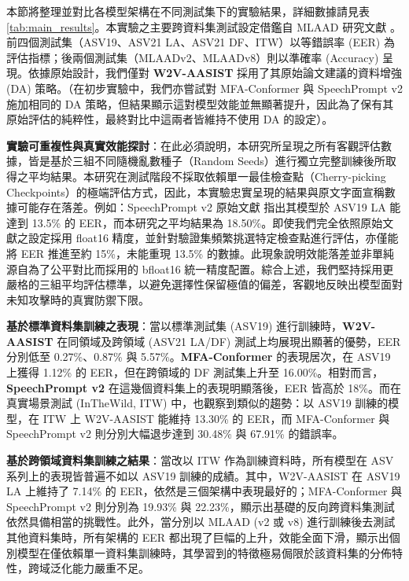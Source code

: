 本節將整理並對比各模型架構在不同測試集下的實驗結果，詳細數據請見表 \ref{tab:main_results}。本實驗之主要跨資料集測試設定借鑑自 MLAAD 研究文獻 \cite{muller2024mlaad}。前四個測試集（ASV19、ASV21 LA、ASV21 DF、ITW）以等錯誤率 (EER) 為評估指標；後兩個測試集（MLAADv2、MLAADv8）則以準確率 (Accuracy) 呈現。依據原始設計，我們僅對 \textbf{W2V-AASIST} 採用了其原始論文建議的資料增強 (DA) 策略。（在初步實驗中，我們亦嘗試對 MFA-Conformer 與 SpeechPrompt v2 施加相同的 DA 策略，但結果顯示這對模型效能並無顯著提升，因此為了保有其原始評估的純粹性，最終對比中這兩者皆維持不使用 DA 的設定）。

\textbf{實驗可重複性與真實效能探討}：在此必須說明，本研究所呈現之所有客觀評估數據，皆是基於三組不同隨機亂數種子（Random Seeds）進行獨立完整訓練後所取得之平均結果。本研究在測試階段不採取依賴單一最佳檢查點（Cherry-picking Checkpoints）的極端評估方式，因此，本實驗忠實呈現的結果與原文字面宣稱數據可能存在落差。例如：SpeechPrompt v2 原始文獻 \cite{chang2023speechprompt} 指出其模型於 ASV19 LA 能達到 13.5\% 的 EER，而本研究之平均結果為 18.50\%。即使我們完全依照原始文獻之設定採用 float16 精度，並針對驗證集頻繁挑選特定檢查點進行評估，亦僅能將 EER 推進至約 15\%，未能重現 13.5\% 的數據。此現象說明效能落差並非單純源自為了公平對比而採用的 bfloat16 統一精度配置。綜合上述，我們堅持採用更嚴格的三組平均評估標準，以避免選擇性保留極值的偏差，客觀地反映出模型面對未知攻擊時的真實防禦下限。

\textbf{基於標準資料集訓練之表現}：當以標準測試集 (ASV19) 進行訓練時，\textbf{W2V-AASIST} 在同領域及跨領域 (ASV21 LA/DF) 測試上均展現出顯著的優勢，EER 分別低至 0.27\%、0.87\% 與 5.57\%。\textbf{MFA-Conformer} 的表現居次，在 ASV19 上獲得 1.12\% 的 EER，但在跨領域的 DF 測試集上升至 16.00\%。相對而言，\textbf{SpeechPrompt v2} 在這幾個資料集上的表現明顯落後，EER 皆高於 18\%。而在真實場景測試 (InTheWild, ITW) 中，也觀察到類似的趨勢：以 ASV19 訓練的模型，在 ITW 上 W2V-AASIST 能維持 13.30\% 的 EER，而 MFA-Conformer 與 SpeechPrompt v2 則分別大幅退步達到 30.48\% 與 67.91\% 的錯誤率。

\textbf{基於跨領域資料集訓練之結果}：當改以 ITW 作為訓練資料時，所有模型在 ASV 系列上的表現皆普遍不如以 ASV19 訓練的成績。其中，W2V-AASIST 在 ASV19 LA 上維持了 7.14\% 的 EER，依然是三個架構中表現最好的；MFA-Conformer 與 SpeechPrompt v2 則分別為 19.93\% 與 22.23\%，顯示出基礎的反向跨資料集測試依然具備相當的挑戰性。此外，當分別以 MLAAD (v2 或 v8) 進行訓練後去測試其他資料集時，所有架構的 EER 都出現了巨幅的上升，效能全面下滑，顯示出個別模型在僅依賴單一資料集訓練時，其學習到的特徵極易侷限於該資料集的分佈特性，跨域泛化能力嚴重不足。

